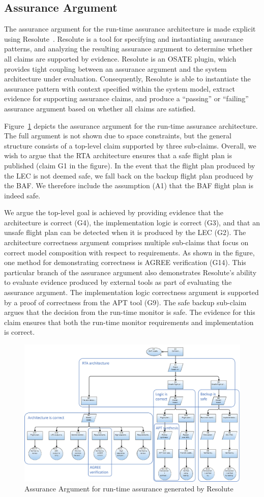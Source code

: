 \subsection{Assurance Argument}

The assurance argument for the run-time assurance architecture is made explicit using Resolute~\cite{resolute}.  Resolute is a tool for specifying and instantiating assurance patterns, and analyzing the resulting assurance argument to determine whether all claims are supported by evidence.  Resolute is an OSATE plugin, which provides tight coupling between an assurance argument and the system architecture under evaluation.  Consequently, Resolute is able to instantiate the assurance pattern with context specified within the system model, extract evidence for supporting assurance claims, and produce a ``passing'' or ``failing'' assurance argument based on whether all claims are satisfied.

Figure~\ref{fig:rta-resolute} depicts the assurance argument for the run-time assurance architecture.  The full argument is not shown due to space constraints, but the general structure consists of a top-level claim supported by three sub-claims.  Overall, we wish to argue that the RTA architecture ensures that a safe flight plan is published (claim G1 in the figure).  In the event that the flight plan produced by the LEC is not deemed safe, we fall back on the backup flight plan produced by the BAF.  We therefore include the assumption (A1) that the BAF flight plan is indeed safe.

We argue the top-level goal is achieved by providing evidence that the architecture is correct (G4), the implementation logic is correct (G3), and that an unsafe flight plan can be detected when it is produced by the LEC (G2).  The architecture correctness argument comprises multiple sub-claims that focus on correct model composition with respect to requirements.  As shown in the figure, one method for demonstrating correctness is AGREE verification (G14).  This particular branch of the assurance argument also demonstrates Resolute's ability to evaluate evidence produced by external tools as part of evaluating the assurance argument.
%
The implementation logic correctness argument is supported by a proof of correctness from the APT tool (G9). The safe backup sub-claim argues that the decision from the run-time monitor is safe. The evidence for this claim ensures that both the run-time monitor requirements and implementation is correct. 

\begin{figure}
	\centering
	\includegraphics[width=\textwidth]{figures/rta-resolute.jpg}
	\caption{Assurance Argument for run-time assurance generated by Resolute}
	\label{fig:rta-resolute}
\end{figure}
